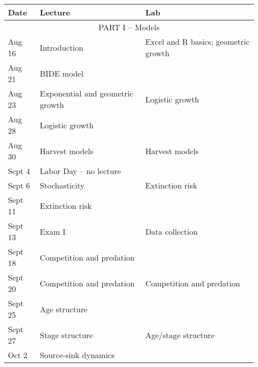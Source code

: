 \documentclass[12pt]{article}
\begin{document}
\begin{center}
\begin{tabular}[c]{lll}
\hline \hline
{\bf Date} & {\bf Lecture}                      & {\bf Lab}                      \\
\hline
           \multicolumn{3}{c}{PART I -- Models}                                        \\
\hline
\hline
Aug 16     & Introduction                       & Excel and R basics; geometric growth \\
\hline
Aug 21     & BIDE model                         &                                      \\
Aug 23     & Exponential and geometric growth   & Logistic growth                      \\
\hline
Aug 28     & Logistic growth                    &                                      \\
Aug 30     & Harvest models                     & Harvest models                       \\
\hline
Sept 4     & Labor Day -- no lecture            &                                      \\
Sept 6     & Stochasticity                      & Extinction risk                      \\
\hline
Sept 11    & Extinction risk                    &                                      \\
Sept 13    & Exam I                             & Data collection                      \\
\hline
Sept 18    & Competition and predation          &                                      \\
Sept 20    & Competition and predation          & Competition and predation            \\
\hline
Sept 25    & Age structure                      &                                      \\
Sept 27    & Stage structure                    & Age/stage structure                  \\
\hline
Oct 2      & Source-sink dynamics               &                                      \\

\end{tabular}
\end{center}
\end{document}
